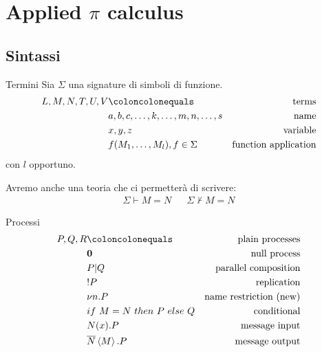 \section{Applied $\pi$ calculus}

\subsection{Sintassi}

\begin{frame}{Termini}
  Sia $\Sigma$ una signature di simboli di funzione.  
  \begin{align*}
    L,M,N,T,U,V & \coloncolonequals & \text{terms} \\
                & a,b,c,\dots,k,\dots,m,n,\dots,s & \text{name} \\
                & x,y,z & \text{variable} \\
                & f(M_1,\dots,M_l), f\in \Sigma & \text{function application}
  \end{align*}
  con $l$ opportuno.

  Avremo anche una teoria che ci permetter\`a di scrivere:
  \begin{align*}
    \Sigma \vdash M = N & & \Sigma \not\vdash M = N
  \end{align*}
\end{frame}

\begin{frame}{Processi}
  \begin{align*}
  P,Q,R & \coloncolonequals & \text{plain processes} \\
  & \mathbf{0} & \text{null process} \\
  & P | Q & \text{parallel composition} \\
  & !P & \text{replication} \\
  & \nu n.P & \text{name restriction (new)} \\
  & if\ M=N\ then\ P\ else\ Q & \text{conditional} \\
  & N(x).P & \text{message input} \\
  & \obar{N}\left< M\right> .P & \text{message output}
\end{align*}

\end{frame}

